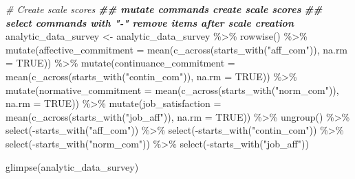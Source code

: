 \documentclass[
]{krantz}
\makeatletter
\newenvironment{Shaded}{\begin{snugshade}}{\end{snugshade}}
\newcommand{\AttributeTok}[1]{\textcolor[rgb]{0.61,0.61,0.61}{#1}}
\newcommand{\CommentTok}[1]{\textcolor[rgb]{0.37,0.37,0.37}{\textit{#1}}}
\newcommand{\ConstantTok}[1]{\textcolor[rgb]{0,0,0}{#1}}
\newcommand{\DocumentationTok}[1]{\textcolor[rgb]{0.37,0.37,0.37}{\textbf{\textit{#1}}}}
\newcommand{\FunctionTok}[1]{\textcolor[rgb]{0,0,0}{#1}}
\newcommand{\NormalTok}[1]{#1}
\newcommand{\OtherTok}[1]{\textcolor[rgb]{0.37,0.37,0.37}{#1}}
\newcommand{\SpecialCharTok}[1]{\textcolor[rgb]{0,0,0}{#1}}
\newcommand{\StringTok}[1]{\textcolor[rgb]{0.5,0.5,0.5}{#1}}
\newenvironment{kframe}{%
\medskip{}
\setlength{\fboxsep}{.8em}
 \def\at@end@of@kframe{}%
 \ifinner\ifhmode%
  \def\at@end@of@kframe{\end{minipage}}%
  \begin{minipage}{\columnwidth}%
 \fi\fi%
 \def\FrameCommand##1{\hskip\@totalleftmargin \hskip-\fboxsep
 \colorbox{shadecolor}{##1}\hskip-\fboxsep
     \hskip-\linewidth \hskip-\@totalleftmargin \hskip\columnwidth}%
 \MakeFramed {\advance\hsize-\width
   \@totalleftmargin\z@ \linewidth\hsize
   \@setminipage}}%
 {\par\unskip\endMakeFramed%
 \at@end@of@kframe}
\renewenvironment{Shaded}{\begin{kframe}}{\end{kframe}}
\makeatother
\begin{document}
\begin{Shaded}
\begin{Highlighting}[]
\CommentTok{\# Create scale scores}
\DocumentationTok{\#\# mutate commands create scale scores}
\DocumentationTok{\#\# select commands with "{-}" remove items after scale creation}
\NormalTok{analytic\_data\_survey }\OtherTok{\textless{}{-}}\NormalTok{ analytic\_data\_survey }\SpecialCharTok{\%\textgreater{}\%} 
  \FunctionTok{rowwise}\NormalTok{() }\SpecialCharTok{\%\textgreater{}\%} 
  \FunctionTok{mutate}\NormalTok{(}\AttributeTok{affective\_commitment =} \FunctionTok{mean}\NormalTok{(}\FunctionTok{c\_across}\NormalTok{(}\FunctionTok{starts\_with}\NormalTok{(}\StringTok{"aff\_com"}\NormalTok{)),}
                                     \AttributeTok{na.rm =} \ConstantTok{TRUE}\NormalTok{)) }\SpecialCharTok{\%\textgreater{}\%}
  \FunctionTok{mutate}\NormalTok{(}\AttributeTok{continuance\_commitment =} \FunctionTok{mean}\NormalTok{(}\FunctionTok{c\_across}\NormalTok{(}\FunctionTok{starts\_with}\NormalTok{(}\StringTok{"contin\_com"}\NormalTok{)),}
                                       \AttributeTok{na.rm =} \ConstantTok{TRUE}\NormalTok{)) }\SpecialCharTok{\%\textgreater{}\%}
  \FunctionTok{mutate}\NormalTok{(}\AttributeTok{normative\_commitment =} \FunctionTok{mean}\NormalTok{(}\FunctionTok{c\_across}\NormalTok{(}\FunctionTok{starts\_with}\NormalTok{(}\StringTok{"norm\_com"}\NormalTok{)),}
                                     \AttributeTok{na.rm =} \ConstantTok{TRUE}\NormalTok{)) }\SpecialCharTok{\%\textgreater{}\%}
  \FunctionTok{mutate}\NormalTok{(}\AttributeTok{job\_satisfaction =} \FunctionTok{mean}\NormalTok{(}\FunctionTok{c\_across}\NormalTok{(}\FunctionTok{starts\_with}\NormalTok{(}\StringTok{"job\_aff"}\NormalTok{)),}
                                 \AttributeTok{na.rm =} \ConstantTok{TRUE}\NormalTok{)) }\SpecialCharTok{\%\textgreater{}\%}
  \FunctionTok{ungroup}\NormalTok{() }\SpecialCharTok{\%\textgreater{}\%}
  \FunctionTok{select}\NormalTok{(}\SpecialCharTok{{-}}\FunctionTok{starts\_with}\NormalTok{(}\StringTok{"aff\_com"}\NormalTok{)) }\SpecialCharTok{\%\textgreater{}\%}
  \FunctionTok{select}\NormalTok{(}\SpecialCharTok{{-}}\FunctionTok{starts\_with}\NormalTok{(}\StringTok{"contin\_com"}\NormalTok{)) }\SpecialCharTok{\%\textgreater{}\%}
  \FunctionTok{select}\NormalTok{(}\SpecialCharTok{{-}}\FunctionTok{starts\_with}\NormalTok{(}\StringTok{"norm\_com"}\NormalTok{)) }\SpecialCharTok{\%\textgreater{}\%}
  \FunctionTok{select}\NormalTok{(}\SpecialCharTok{{-}}\FunctionTok{starts\_with}\NormalTok{(}\StringTok{"job\_aff"}\NormalTok{)) }


\FunctionTok{glimpse}\NormalTok{(analytic\_data\_survey)}
\end{Highlighting}
\end{Shaded}
\end{document}

